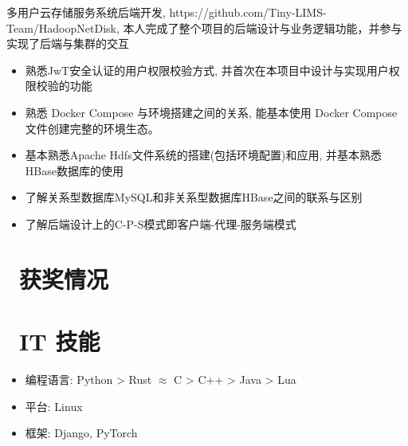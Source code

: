 \documentclass{resume}
\begin{document}
\begin{onehalfspacing}
多用户云存储服务系统后端开发, https://github.com/Tiny-LIMS-Team/HadoopNetDisk, 本人完成了整个项目的后端设计与业务逻辑功能，并参与实现了后端与集群的交互
\begin{itemize}
  \item 熟悉JwT安全认证的用户权限校验方式, 并首次在本项目中设计与实现用户权限校验的功能
  \item 熟悉 Docker Compose 与环境搭建之间的关系, 能基本使用 Docker Compose 文件创建完整的环境生态。
  \item 基本熟悉Apache Hdfs文件系统的搭建(包括环境配置)和应用, 并基本熟悉HBase数据库的使用
  \item 了解关系型数据库MySQL和非关系型数据库HBase之间的联系与区别
  \item 了解后端设计上的C-P-S模式即客户端-代理-服务端模式
\end{itemize}
\end{onehalfspacing}

\section{\faHeartO\ 获奖情况}

\section{\faCogs\ IT 技能}
\begin{itemize}[parsep=0.5ex]
  \item 编程语言: Python > Rust $\approx$ C > C++ > Java > Lua
  \item 平台: Linux
  \item 框架: Django, PyTorch
\end{itemize}


%
%
\end{document}
